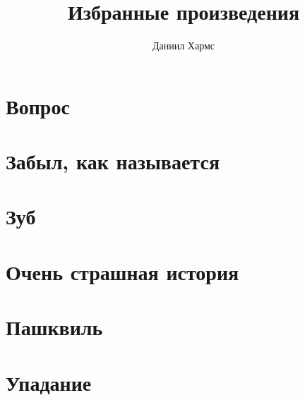 \documentclass[12pt, a5paper]{book}
\title{Избранные произведения}
\author{Даниил Хармс}
\date{}
\begin{document}
\maketitle

\chapter{Вопрос}


\chapter{Забыл, как называется}


\chapter{Зуб}


\chapter{Очень страшная история}


\chapter{Пашквиль}


\chapter{Упадание}

\end{document}
